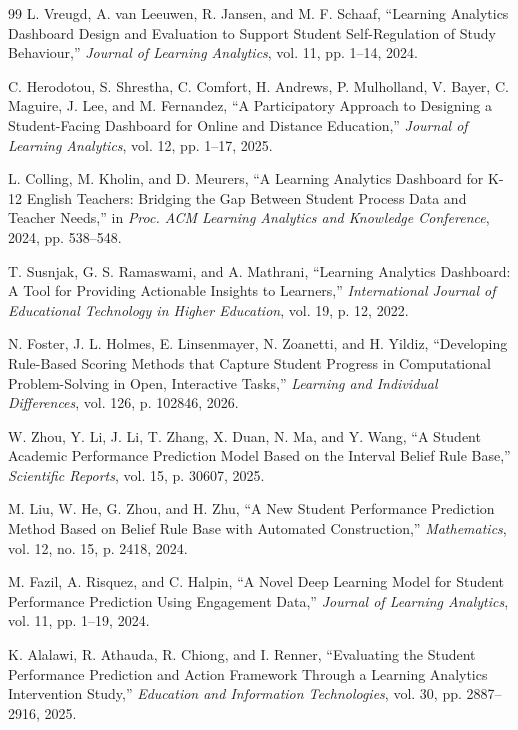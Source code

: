 \documentclass[conference]{IEEEtran}
\begin{document}
\begin{thebibliography}{99}
L. Vreugd, A. van Leeuwen, R. Jansen, and M. F. Schaaf, ``Learning Analytics Dashboard Design and Evaluation to Support Student Self-Regulation of Study Behaviour,'' \textit{Journal of Learning Analytics}, vol. 11, pp. 1--14, 2024.

C. Herodotou, S. Shrestha, C. Comfort, H. Andrews, P. Mulholland, V. Bayer, C. Maguire, J. Lee, and M. Fernandez, ``A Participatory Approach to Designing a Student-Facing Dashboard for Online and Distance Education,'' \textit{Journal of Learning Analytics}, vol. 12, pp. 1--17, 2025.

L. Colling, M. Kholin, and D. Meurers, ``A Learning Analytics Dashboard for K-12 English Teachers: Bridging the Gap Between Student Process Data and Teacher Needs,'' in \textit{Proc. ACM Learning Analytics and Knowledge Conference}, 2024, pp. 538--548.

T. Susnjak, G. S. Ramaswami, and A. Mathrani, ``Learning Analytics Dashboard: A Tool for Providing Actionable Insights to Learners,'' \textit{International Journal of Educational Technology in Higher Education}, vol. 19, p. 12, 2022.

N. Foster, J. L. Holmes, E. Linsenmayer, N. Zoanetti, and H. Yildiz, ``Developing Rule-Based Scoring Methods that Capture Student Progress in Computational Problem-Solving in Open, Interactive Tasks,'' \textit{Learning and Individual Differences}, vol. 126, p. 102846, 2026.

W. Zhou, Y. Li, J. Li, T. Zhang, X. Duan, N. Ma, and Y. Wang, ``A Student Academic Performance Prediction Model Based on the Interval Belief Rule Base,'' \textit{Scientific Reports}, vol. 15, p. 30607, 2025.

M. Liu, W. He, G. Zhou, and H. Zhu, ``A New Student Performance Prediction Method Based on Belief Rule Base with Automated Construction,'' \textit{Mathematics}, vol. 12, no. 15, p. 2418, 2024.

M. Fazil, A. Risquez, and C. Halpin, ``A Novel Deep Learning Model for Student Performance Prediction Using Engagement Data,'' \textit{Journal of Learning Analytics}, vol. 11, pp. 1--19, 2024.

K. Alalawi, R. Athauda, R. Chiong, and I. Renner, ``Evaluating the Student Performance Prediction and Action Framework Through a Learning Analytics Intervention Study,'' \textit{Education and Information Technologies}, vol. 30, pp. 2887--2916, 2025.


\end{thebibliography}
\end{document}
